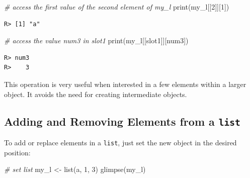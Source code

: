\documentclass[
  12pt,
]{book}
\newenvironment{Shaded}{\begin{snugshade}}{\end{snugshade}}
\newcommand{\CommentTok}[1]{\textcolor[rgb]{0.37,0.37,0.37}{\textit{#1}}}
\newcommand{\DecValTok}[1]{\textcolor[rgb]{0.06,0.06,0.06}{#1}}
\newcommand{\FunctionTok}[1]{\textcolor[rgb]{0,0,0}{#1}}
\newcommand{\NormalTok}[1]{#1}
\newcommand{\OtherTok}[1]{\textcolor[rgb]{0.37,0.37,0.37}{#1}}
\newcommand{\StringTok}[1]{\textcolor[rgb]{0.5,0.5,0.5}{#1}}
\begin{document}
\begin{Shaded}
\begin{Highlighting}[]
\CommentTok{\# access the first value of the second element of my\_l}
\FunctionTok{print}\NormalTok{(my\_l[[}\DecValTok{2}\NormalTok{]][}\DecValTok{1}\NormalTok{])}
\end{Highlighting}
\end{Shaded}

\begin{verbatim}
R> [1] "a"
\end{verbatim}

\begin{Shaded}
\begin{Highlighting}[]
\CommentTok{\# access the value \textquotesingle{}num3\textquotesingle{} in \textquotesingle{}slot1\textquotesingle{}}
\FunctionTok{print}\NormalTok{(my\_l[[}\StringTok{\textquotesingle{}slot1\textquotesingle{}}\NormalTok{]][}\StringTok{\textquotesingle{}num3\textquotesingle{}}\NormalTok{])}
\end{Highlighting}
\end{Shaded}

\begin{verbatim}
R> num3 
R>    3
\end{verbatim}

This operation is very useful when interested in a few elements within a larger object. It avoids the need for creating intermediate objects.

\hypertarget{adding-and-removing-elements-from-a-list}{%
\subsection{\texorpdfstring{Adding and Removing Elements from a \texttt{list}}{Adding and Removing Elements from a list}}\label{adding-and-removing-elements-from-a-list}}

To add or replace elements in a \texttt{list}, just set the new object in the desired position:

\begin{Shaded}
\begin{Highlighting}[]
\CommentTok{\# set list}
\NormalTok{my\_l }\OtherTok{\textless{}{-}} \FunctionTok{list}\NormalTok{(}\StringTok{\textquotesingle{}a\textquotesingle{}}\NormalTok{, }\DecValTok{1}\NormalTok{, }\DecValTok{3}\NormalTok{)}
\FunctionTok{glimpse}\NormalTok{(my\_l)}
\end{Highlighting}
\end{Shaded}
\end{document}
